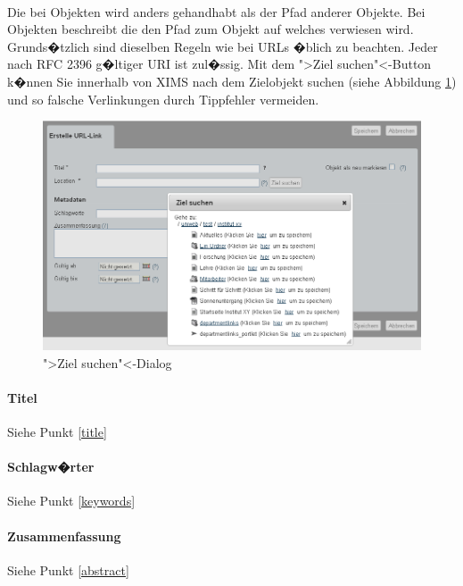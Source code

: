 \paragraph{}
Die  bei  Objekten wird anders gehandhabt als 
der Pfad 
anderer Objekte. Bei  Objekten beschreibt die  den Pfad zum Objekt auf welches verwiesen wird.
Grunds�tzlich sind dieselben Regeln wie bei URLs �blich zu beachten. Jeder nach RFC 2396 g�ltiger URI ist zul�ssig. Mit dem ">Ziel suchen"<-Button k�nnen Sie innerhalb von XIMS nach dem Zielobjekt suchen (siehe Abbildung \ref{fig:urlzielsuchen}) und so falsche Verlinkungen durch Tippfehler vermeiden.

\begin{figure}[!ht]
  \centering
  \includegraphics[width=\textwidth]{./images/urllink-ziel-suchen.png}
  \caption{">Ziel suchen"<-Dialog}
  \label{fig:urlzielsuchen}
\end{figure}

\paragraph{Titel}
Siehe Punkt \ref{title}

\paragraph{Schlagw�rter}
Siehe Punkt \ref{keywords}

\paragraph{Zusammenfassung}
Siehe Punkt \ref{abstract}

